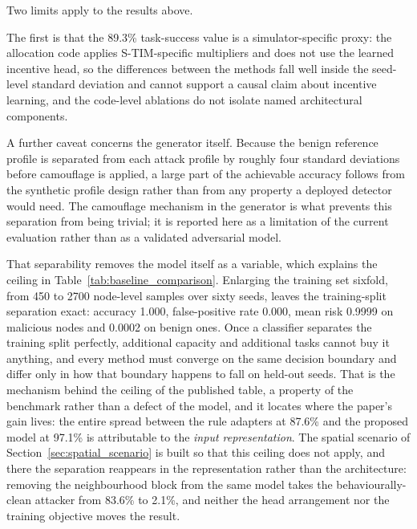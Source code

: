 \documentclass[notspecified,article,submit,moreauthors]{Definitions/mdpi}
\begin{document}
Two limits apply to the results above.

The first is that the 89.3\% task-success value is a simulator-specific proxy: the allocation code applies S-TIM-specific multipliers and does not use the learned incentive head, so the differences between the methods fall well inside the seed-level standard deviation and cannot support a causal claim about incentive learning, and the code-level ablations do not isolate named architectural components.

A further caveat concerns the generator itself. Because the benign reference profile is separated from each attack profile by roughly four standard deviations before camouflage is applied, a large part of the achievable accuracy follows from the synthetic profile design rather than from any property a deployed detector would need. The camouflage mechanism in the generator is what prevents this separation from being trivial; it is reported here as a limitation of the current evaluation rather than as a validated adversarial model.

That separability removes the model itself as a variable, which explains the ceiling in Table~\ref{tab:baseline_comparison}. Enlarging the training set sixfold, from 450 to 2700 node-level samples over sixty seeds, leaves the training-split separation exact: accuracy 1.000, false-positive rate 0.000, mean risk 0.9999 on malicious nodes and 0.0002 on benign ones. Once a classifier separates the training split perfectly, additional capacity and additional tasks cannot buy it anything, and every method must converge on the same decision boundary and differ only in how that boundary happens to fall on held-out seeds. That is the mechanism behind the ceiling of the published table, a property of the benchmark rather than a defect of the model, and it locates where the paper's gain lives: the entire spread between the rule adapters at 87.6\% and the proposed model at 97.1\% is attributable to the \emph{input representation}. The spatial scenario of Section~\ref{sec:spatial_scenario} is built so that this ceiling does not apply, and there the separation reappears in the representation rather than the architecture: removing the neighbourhood block from the same model takes the behaviourally-clean attacker from 83.6\% to 2.1\%, and neither the head arrangement nor the training objective moves the result.
\end{document}
